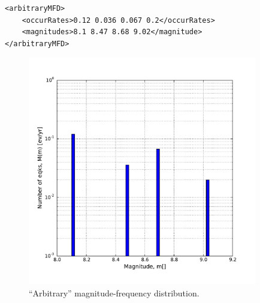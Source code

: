 \begin{description}
\begin{verbatim}
<arbitraryMFD>
    <occurRates>0.12 0.036 0.067 0.2</occurRates>
    <magnitudes>8.1 8.47 8.68 9.02</magnitude>
</arbitraryMFD>
\end{verbatim}

\begin{figure}[!ht]
\centering
\includegraphics[width=10cm]{figures/hazard/arb_mfd.pdf}
\caption{``Arbitrary'' magnitude-frequency distribution.}
\label{fig:arb_mfd}
\end{figure}

\end{description}